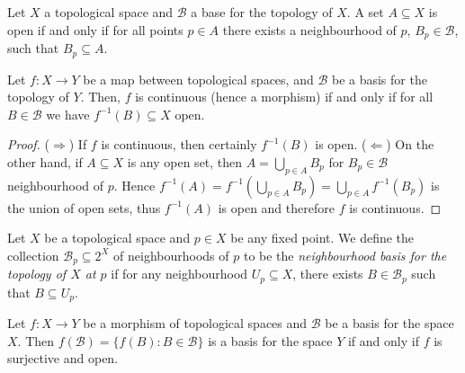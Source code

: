\begin{proposition}
  Let \(X\) a topological space and \(\mathcal B\) a base for the topology of
  \(X\). A set \(A \subseteq X\) is open if and only if for all points \(p \in
  A\) there exists a neighbourhood of \(p\), \(B_p \in \mathcal B\), such that
  \(B_p \subseteq A\).
\end{proposition}

\begin{proposition}
  Let \(f: X \to Y\) be a map between topological spaces, and \(\mathcal B\) be
  a basis for the topology of \(Y\). Then, \(f\) is continuous (hence a
  morphism) if and only if for all \(B \in \mathcal B\) we have \(f^{-1}(B)
  \subseteq X\) open.
\end{proposition}

\begin{proof}
  (\(\Rightarrow\)) If \(f\) is continuous, then certainly \(f^{-1}(B)\) is
  open. (\(\Leftarrow\)) On the other hand, if \(A \subseteq X\) is any open
  set, then \(A = \bigcup_{p \in A} B_p\) for \(B_p \in \mathcal B\)
  neighbourhood of \(p\). Hence \(f^{-1}(A) = f^{-1} \left( \bigcup_{p \in A}
  B_p \right) = \bigcup_{p \in A} f^{-1}(B_p)\) is the union of open sets, thus
  \(f^{-1}(A)\) is open and therefore \(f\) is continuous.
\end{proof}

\begin{definition}\label{def: basis at a point}
  Let \(X\) be a topological space and \(p \in X\) be any fixed point. We define
  the collection \(\mathcal B_p \subseteq 2^X\) of neighbourhoods of \(p\) to be
  the \emph{neighbourhood basis for the topology of \(X\) at \(p\)} if for any
  neighbourhood \(U_p \subseteq X\), there exists \(B \in \mathcal B_p\) such
  that \(B \subseteq U_p\).
\end{definition}

\begin{proposition}\label{prop: basis image surjective}
  Let \(f: X \to Y\) be a morphism of topological spaces and \(\mathcal B\) be a
  basis for the space \(X\). Then \(f(\mathcal B) = \{f(B): B \in \mathcal B\}\) 
  is a basis for the space \(Y\) if and only if \(f\) is surjective and open.
\end{proposition}

